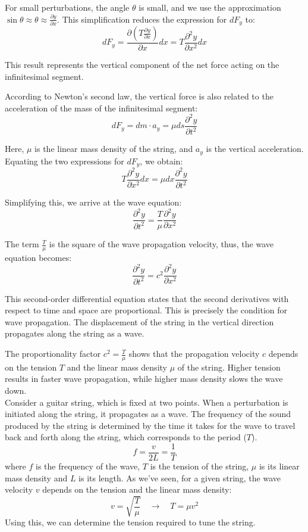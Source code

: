 \documentclass[a4paper]{article}
\begin{document}
For small perturbations, the angle \(\theta\) is small, and we use the approximation \(\sin \theta \approx \theta \approx \frac{\partial y}{\partial x}\). This simplification reduces the expression for \(dF_y\) to:
\[
dF_y = \frac{\partial (T \frac{\partial y}{\partial x})}{\partial x} dx = T \frac{\partial^2 y}{\partial x^2} dx
\]

This result represents the vertical component of the net force acting on the infinitesimal segment. 

According to Newton's second law, the vertical force is also related to the acceleration of the mass of the infinitesimal segment:
\[
dF_y = dm \cdot a_y = \mu ds \frac{\partial^2 y}{\partial t^2}
\]

Here, \(\mu\) is the linear mass density of the string, and \(a_y\) is the vertical acceleration. Equating the two expressions for \(dF_y\), we obtain:
\[
T \frac{\partial^2 y}{\partial x^2} dx = \mu dx \frac{\partial^2 y}{\partial t^2}
\]

Simplifying this, we arrive at the wave equation:
\[
\frac{\partial^2 y}{\partial t^2} = \frac{T}{\mu} \frac{\partial^2 y}{\partial x^2}
\]

The term \(\frac{T}{\mu}\) is the square of the wave propagation velocity, thus, the wave equation becomes:
\[
\frac{\partial^2 y}{\partial t^2} = c^2 \frac{\partial^2 y}{\partial x^2}
\]

This second-order differential equation states that the second derivatives with respect to time and space are proportional. This is precisely the condition for wave propagation. The displacement of the string in the vertical direction propagates along the string as a wave.

The proportionality factor \(c^2 = \frac{T}{\mu}\) shows that the propagation velocity \(c\) depends on the tension \(T\) and the linear mass density \(\mu\) of the string. Higher tension results in faster wave propagation, while higher mass density slows the wave down.  \\

Consider a guitar string, which is fixed at two points. When a perturbation is initiated along the string, it propagates as a wave. The frequency of the sound produced by the string is determined by the time it takes for the wave to travel back and forth along the string, which corresponds to the period (\(T\)).
\[
f = \frac{v}{2L} = \frac{1}{T}
\]
where \(f\) is the frequency of the wave, \(T\) is the tension of the string, \(\mu\) is its linear mass density and \(L\) is its length. As we've seen, for a given string, the wave velocity \(v\) depends on the tension and the linear mass density:
\[
v = \sqrt{\frac{T}{\mu}} \quad \to \quad T = \mu v^2 
\]
Using this, we can determine the tension required to tune the string. 
\end{document}
